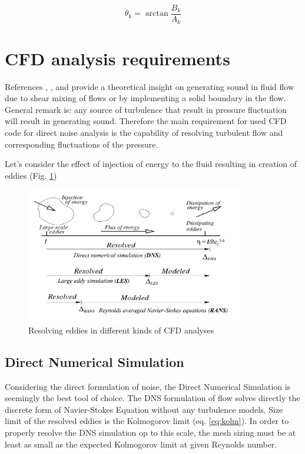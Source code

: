 \begin{equation} \label{eq:dftphase}
\theta_k = \arctan \frac{B_k}{A_k}
\end{equation}


\section{CFD analysis requirements} \label{cfdreq}
References \citep{Light1}, \citep{Light2}, \citep{FWH} and \citep{curle} provide a theoretical insight on generating sound in fluid flow due to shear mixing of flows or by implementing a solid boundary in the flow. General remark is: any source of turbulence that result in pressure fluctuation will result in generating sound. Therefore the main requirement for used CFD code for direct noise analysis is the capability of resolving turbulent flow and corresponding fluctuations of the pressure.

Let's consider the effect of injection of energy to the fluid resulting in creation of eddies (Fig. \ref{CFDTypes})

\begin{figure}[h!]
\centering %
\includegraphics[width=0.85\textwidth]{Pictures/CFD_Types.png}
\caption{Resolving eddies in different kinds of CFD analyses}
\label{CFDTypes}
\end{figure}

\subsection{Direct Numerical Simulation} \label{DNS}
Considering the direct formulation of noise, the Direct Numerical Simulation is seemingly the best tool of choice. The DNS formulation of flow solves directly the discrete form of Navier-Stokes Equation without any turbulence models. Size limit of the resolved eddies is the Kolmogorov limit (eq. \ref{eq:kolm}). In order to properly resolve the DNS simulation op to this scale, the mesh sizing must be at least as small as the expected Kolmogorov limit at given Reynolds number.

